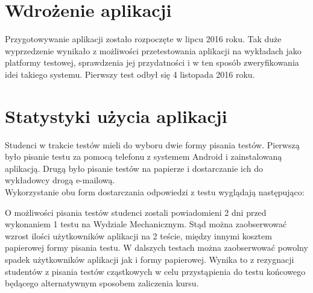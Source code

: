 \documentclass[eng]{mgr}
\begin{document}
		\section{Wdrożenie aplikacji}
		
		Przygotowywanie aplikacji zostało rozpoczęte w lipcu 2016 roku. Tak duże wyprzedzenie wynikało z możliwości przetestowania aplikacji na wykładach jako platformy testowej, sprawdzenia jej przydatności i w ten sposób zweryfikowania idei takiego systemu. Pierwszy test odbył się 4 listopada 2016 roku.

		\section{Statystyki użycia aplikacji}
			
		Studenci w trakcie testów mieli do wyboru dwie formy pisania testów. Pierwszą było pisanie testu za pomocą telefonu z systemem Android i zainstalowaną aplikacją. Drugą było pisanie testów na papierze i dostarczanie ich do wykładowcy drogą e-mailową.\\
		Wykorzystanie obu form dostarczania odpowiedzi z testu wyglądają następująco:
			
		\begin{center}
		\end{center}
	
		O możliwości pisania testów studenci zostali powiadomieni 2 dni przed wykonaniem 1 testu na Wydziale Mechanicznym. Stąd można zaobserwować wzrost ilości użytkowników aplikacji na 2 teście, między innymi kosztem papierowej formy pisania testu. W dalszych testach można zaobserwować powolny spadek użytkowników aplikacji jak i formy papierowej. Wynika to z rezygnacji studentów z pisania testów cząstkowych w celu przystąpienia do testu końcowego będącego alternatywnym sposobem zaliczenia kursu.
	
\end{document}
